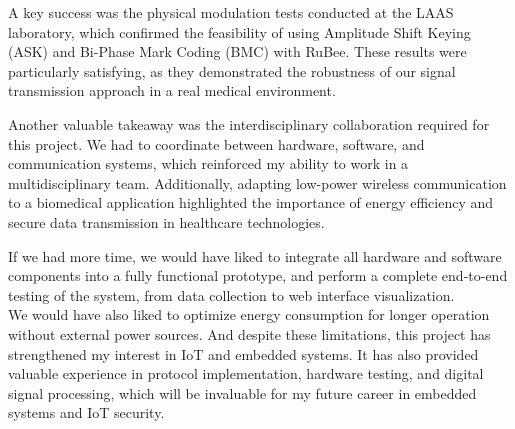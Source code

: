 \noindent A key success was the physical modulation tests conducted at the LAAS laboratory, which confirmed the feasibility of using Amplitude Shift Keying (ASK) and Bi-Phase Mark Coding (BMC) with RuBee. These results were particularly satisfying, as they demonstrated the robustness of our signal transmission approach in a real medical environment.
\vspace{0.25cm}

\noindent Another valuable takeaway was the interdisciplinary collaboration required for this project. We had to coordinate between hardware, software, and communication systems, which reinforced my ability to work in a multidisciplinary team. Additionally, adapting low-power wireless communication to a biomedical application highlighted the importance of energy efficiency and secure data transmission in healthcare technologies.
\vspace{0.25cm}

\noindent If we had more time, we would have liked to integrate all hardware and software components into a fully functional prototype, and perform a complete end-to-end testing of the system, from data collection to web interface visualization.\\
We would have also liked to optimize energy consumption for longer operation without external power sources. And despite these limitations, this project has strengthened my interest in  IoT and embedded systems. It has also provided valuable experience in protocol implementation, hardware testing, and digital signal processing, which will be invaluable for my future career in embedded systems and IoT security.
